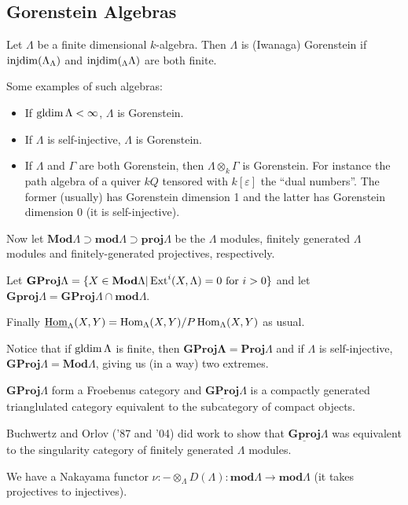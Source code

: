 \documentclass[12pt]{article}
\DeclareMathOperator{\uHom}{\underline{Hom}}
\begin{document}
\subsection{Gorenstein Algebras}
\begin{defn}
	Let $\Lambda$ be a finite dimensional $k$-algebra. Then $\Lambda$ is (Iwanaga) Gorenstein if $\operatorname{injdim}(\Lambda_\Lambda)$ and $\operatorname{injdim}({_\Lambda}\Lambda)$ are both finite.
\end{defn}
Some examples of such algebras:
\begin{itemize}
	\item If $\operatorname{gldim} \Lambda<\infty$, $\Lambda$ is Gorenstein.
	\item If $\Lambda$ is self-injective, $\Lambda$ is Gorenstein.
	\item If $\Lambda$ and $\Gamma$ are both Gorenstein, then $\Lambda\otimes_k\Gamma$ is Gorenstein. For instance the path algebra of a quiver $kQ$ tensored with $k[\varepsilon]$ the ``dual numbers''.
	The former (usually) has Gorenstein dimension 1 and the latter has Gorenstein dimension 0 (it is self-injective).
\end{itemize}

Now let $\mathbf{Mod}\Lambda\supset \mathbf{mod}\Lambda\supset \mathbf{proj}\Lambda$ be the $\Lambda$ modules, finitely generated $\Lambda$ modules and finitely-generated projectives, respectively.

Let $\mathbf{GProj}\Lambda=\{X\in\mathbf{Mod}\Lambda|\operatorname{Ext}^i(X,\Lambda)=0\text{ for }i>0\}$ and let $\mathbf{Gproj}\Lambda=\mathbf{GProj}\Lambda\cap\mathbf{mod}\Lambda$.

Finally $\uHom_\Lambda(X,Y)=\Hom_\Lambda(X,Y)/P\Hom_\Lambda(X,Y)$ as usual.

Notice that if $\operatorname{gldim}\Lambda$ is finite, then $\mathbf{GProj\Lambda}=\mathbf{Proj}\Lambda$ and if $\Lambda$ is self-injective, 
$\mathbf{GProj}\Lambda=\mathbf{Mod}\Lambda$, giving us (in a way) two extremes.

\begin{lem}
	$\mathbf{GProj}\Lambda$ form a Froebenus category and $\underline{\mathbf{GProj}}\Lambda$ is a compactly generated trianglulated category equivalent to the subcategory of compact objects.
\end{lem}

Buchwertz and Orlov ('87 and '04) did work to show that $\underline{\mathbf{Gproj}}\Lambda$ was equivalent to the singularity category of finitely generated $\Lambda$ modules.

We have a Nakayama functor $\nu:-\otimes_\Lambda D(\Lambda):\mathbf{mod}\Lambda\to \mathbf{mod}\Lambda$ (it takes projectives to injectives).
\end{document}
